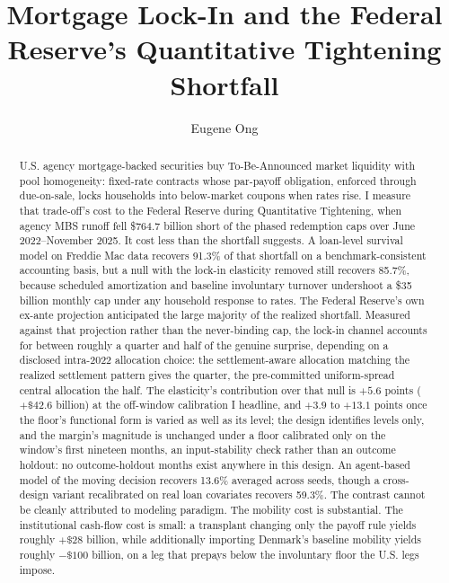 \documentclass[12pt]{article}
\title{Mortgage Lock-In and the Federal Reserve's Quantitative Tightening Shortfall}
\author{Eugene Ong}
\affil{Carnegie Mellon University}
\date{}
\begin{document}
\maketitle
\begin{abstract}
\noindent U.S. agency mortgage-backed securities buy To-Be-Announced market liquidity with pool homogeneity: fixed-rate contracts whose par-payoff obligation, enforced through due-on-sale, locks households into below-market coupons when rates rise. I measure that trade-off's cost to the Federal Reserve during Quantitative Tightening, when agency MBS runoff fell \$764.7 billion short of the phased redemption caps over June 2022--November 2025. It cost less than the shortfall suggests. A loan-level survival model on Freddie Mac data recovers 91.3\% of that shortfall on a benchmark-consistent accounting basis, but a null with the lock-in elasticity removed still recovers 85.7\%, because scheduled amortization and baseline involuntary turnover undershoot a \$35 billion monthly cap under any household response to rates. The Federal Reserve's own ex-ante projection anticipated the large majority of the realized shortfall. Measured against that projection rather than the never-binding cap, the lock-in channel accounts for between roughly a quarter and half of the genuine surprise, depending on a disclosed intra-2022 allocation choice: the settlement-aware allocation matching the realized settlement pattern gives the quarter, the pre-committed uniform-spread central allocation the half. The elasticity's contribution over that null is $+5.6$ points ($+\$42.6$ billion) at the off-window calibration I headline, and $+3.9$ to $+13.1$ points once the floor's functional form is varied as well as its level; the design identifies levels only, and the margin's magnitude is unchanged under a floor calibrated only on the window's first nineteen months, an input-stability check rather than an outcome holdout: no outcome-holdout months exist anywhere in this design. An agent-based model of the moving decision recovers 13.6\% averaged across seeds, though a cross-design variant recalibrated on real loan covariates recovers 59.3\%. The contrast cannot be cleanly attributed to modeling paradigm. The mobility cost is substantial. The institutional cash-flow cost is small: a transplant changing only the payoff rule yields roughly $+\$28$ billion, while additionally importing Denmark's baseline mobility yields roughly $-\$100$ billion, on a leg that prepays below the involuntary floor the U.S. legs impose.
\end{abstract}
\end{document}
